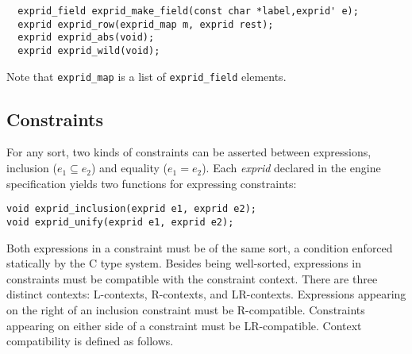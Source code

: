 \documentclass{article}
\newcommand{\id}[1]{{\it #1\/}}
\begin{document}
\begin{verbatim}
  exprid_field exprid_make_field(const char *label,exprid' e);
  exprid exprid_row(exprid_map m, exprid rest);
  exprid exprid_abs(void);
  exprid exprid_wild(void);
\end{verbatim}

Note that \texttt{exprid\_map} is a list of \texttt{exprid\_field} elements.

\subsection{Constraints}
For any sort, two kinds of constraints can be asserted between expressions,
inclusion ($e_1 \subseteq e_2$) and equality ($e_1 = e_2$). Each \id{exprid}
declared in the engine specification yields two functions for expressing 
constraints:
\begin{verbatim}
void exprid_inclusion(exprid e1, exprid e2);
void exprid_unify(exprid e1, exprid e2);
\end{verbatim}

Both expressions in a constraint must be of the same sort, a condition 
enforced statically by the C type system. Besides being well-sorted, 
expressions in constraints must be compatible with the constraint context.
There are three distinct contexts: L-contexts, R-contexts, and LR-contexts.
Expressions appearing on the right of an inclusion constraint must be 
R-compatible. Constraints appearing on either side of a constraint must be 
LR-compatible. Context compatibility is defined as follows.
 
\end{document}
